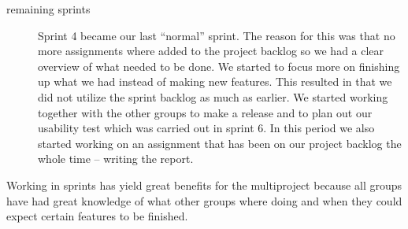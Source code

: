 \begin{description}
\item[remaining sprints]
	Sprint 4 became our last ``normal'' sprint. The reason for this was that no more assignments where added to the project backlog so we had a clear overview of what needed to be done. We started to focus more on finishing up what we had instead of making new features. This resulted in that we did not utilize the sprint backlog as much as earlier. We started working together with the other groups to make a release and to plan out our usability test which was carried out in sprint 6. In this period we also started working on an assignment that has been on our project backlog the whole time -- writing the report.  
\end{description}

Working in sprints has yield great benefits for the multiproject because all groups have had great knowledge of what other groups where doing and when they could expect certain features to be finished. 